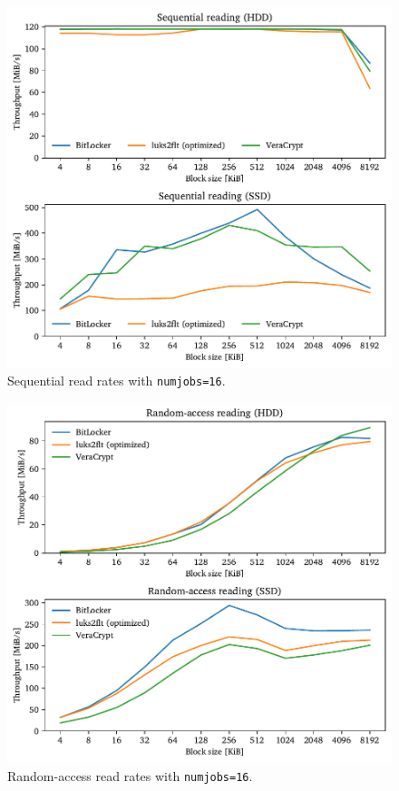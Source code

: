 \begin{figure}[htb!]
	\center
	\includegraphics[scale=1]{../fig/performance.hwexperiments.optseqthreads.pdf}
	\caption[
		Sequential read rates with \texttt{numjobs=16}
	]{
		Sequential read rates with \texttt{numjobs=16}. 
	}
	\label{fig:performance.hwexperiments.optseqthreads}
\end{figure}

\begin{figure}[htb!]
	\center
	\includegraphics[scale=1]{../fig/performance.hwexperiments.optrandthreads.pdf}
	\caption[
		Random-access read rates with \texttt{numjobs=16}
	]{
		Random-access read rates with \texttt{numjobs=16}. 
	}
	\label{fig:performance.hwexperiments.optrandthreads}
\end{figure}

